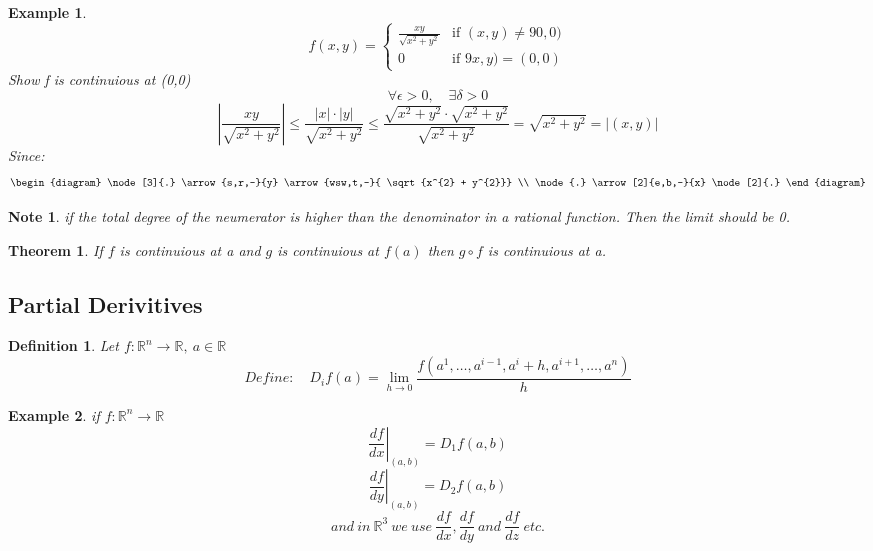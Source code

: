 \documentclass[12pt]{article}
\def\RR{\mathbb{R}}
\newtheorem{theorem}{Theorem}[section]
\newtheorem{definition}{Definition}[section]
\newtheorem{example}{Example}[section]
\newtheorem*{note}{Note}
\begin{document}
\begin{example}

\[
 f(x,y) =
  \begin{cases}
   \frac{xy}{\sqrt{x^{2} + y^{2}}} & \text{if } (x,y) \neq 90,0) \\
   0       & \text{if } 9x,y) = (0,0)
  \end{cases}
\]
Show f is continuious at (0,0)
\[\forall \epsilon > 0, \quad \exists \delta>0\]
\[\left| \frac{xy}{\sqrt{x^{2} + y^{2}}}\right| \leq \frac{|x| \cdot |y|}{\sqrt{x^{2} + y^{2}}} \leq \frac{\sqrt{x^{2} + y^{2}} \cdot \sqrt{x^{2} + y^{2}}}{\sqrt{x^{2} + y^{2}}}= \sqrt{x^{2} + y^{2}} = |(x,y)|\]
Since: \[\begin{diagram}
\node[3]{.} \arrow{s,r,-}{y} \arrow{wsw,t,-}{ \sqrt{x^{2} + y^{2}}} \\
\node{.} \arrow[2]{e,b,-}{x} \node[2]{.}
\end{diagram}\]
\end{example}
\begin{note}
if the total degree of the neumerator is higher than the denominator in a rational function. Then the limit should be 0.
\end{note}

\begin{theorem}\label{T:composition}
If $f$ is continuious at a and $g$ is continuious at $f(a)$ then $g \circ f$ is continuious at a.
\end{theorem}

\subsection{Partial Derivitives}

\begin{definition}
Let $f:\RR^{n} \rightarrow \RR, \: a\in \RR$
\[Define: \quad D_{i}f(a) = \lim_{h \to 0}\frac{f(a^{1}, \dots , a^{i-1}, a^{i}+h, a^{i+1}, \dots , a^{n})}{h}\]
\end{definition}

\begin{example}
if $f:\RR^{n} \rightarrow \RR$
\[\left.\frac{df}{dx}\right| _{(a,b)} = D_{1}f(a,b)\]
\[\left.\frac{df}{dy}\right| _{(a,b)} = D_{2}f(a,b)\]
\[and \: in \: \RR^{3} \: we\: use \: \frac{df}{dx}, \frac{df}{dy} \: and \: \frac{df}{dz} \: etc.\]
\end{example}
\end{document}
